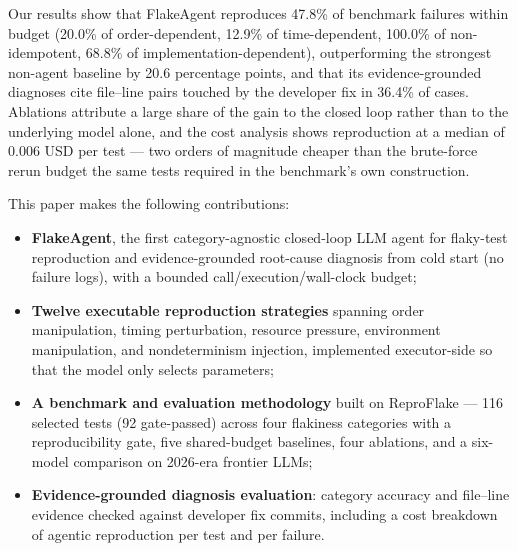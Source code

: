 Our results show that FlakeAgent reproduces 47.8\% of benchmark failures
within budget (20.0\% of order-dependent, 12.9\% of time-dependent,
100.0\% of non-idempotent, 68.8\% of implementation-dependent),
outperforming the strongest non-agent baseline by 20.6 percentage points,
and that its evidence-grounded diagnoses cite file--line pairs touched by the
developer fix in 36.4\% of cases. Ablations attribute a large share of
the gain to the closed loop rather than to the underlying model alone, and
the cost analysis shows reproduction at a median of 0.006 USD per test —
two orders of magnitude cheaper than the brute-force rerun budget the same
tests required in the benchmark's own construction.

This paper makes the following contributions:
\begin{itemize}
\item \textbf{FlakeAgent}, the first category-agnostic closed-loop LLM agent
for flaky-test reproduction and evidence-grounded root-cause diagnosis from
cold start (no failure logs), with a bounded call/execution/wall-clock budget;
\item \textbf{Twelve executable reproduction strategies} spanning order
manipulation, timing perturbation, resource pressure, environment
manipulation, and nondeterminism injection, implemented executor-side so that
the model only selects parameters;
\item \textbf{A benchmark and evaluation methodology} built on ReproFlake —
116 selected tests (92 gate-passed) across four flakiness categories with a
reproducibility gate, five shared-budget baselines, four ablations, and a
six-model comparison on 2026-era frontier LLMs;
\item \textbf{Evidence-grounded diagnosis evaluation}: category accuracy and
file--line evidence checked against developer fix commits, including a
cost breakdown of agentic reproduction per test and per failure.
\end{itemize}
